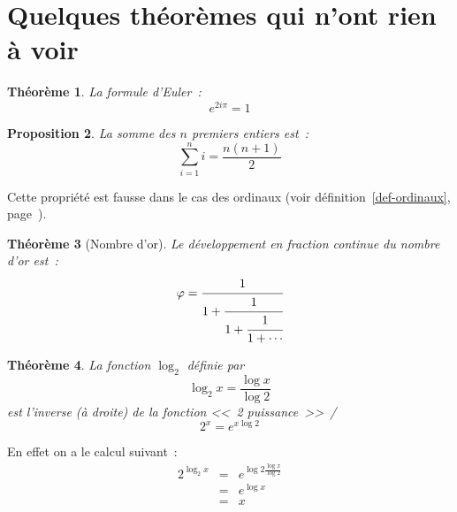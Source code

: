\documentclass{article}
\newtheorem{theo}{Théorème}[section]    %
\newtheorem{prop}[theo]{Proposition}    %
\newcommand{\expo}[2]{#1^{#2}}
\begin{document}
\section{Quelques théorèmes qui n'ont rien à voir}

\begin{theo}
  La formule d'Euler~:
  \begin{equation}
    \expo e{2i\pi}=1 %
  \end{equation}
\end{theo}

\begin{prop}
  La somme des $n$ premiers entiers est~:
  \begin{displaymath}
    \sum_{i=1}^ni = \frac{n(n+1)}2
  \end{displaymath}
\end{prop}
Cette propriété est fausse dans le cas des ordinaux (voir
définition~\ref{def-ordinaux}, page~\pageref{def-ordinaux}).

\begin{theo}[Nombre d'or]
  Le développement en fraction continue du nombre d'or est~:
  \begin{equation*} %
    \varphi = \cfrac 1{1+\cfrac 1{1 + \cfrac 1{1 + \dotsb}}}
  \end{equation*}
\end{theo}

\begin{theo}\label{theo-log2}
  La fonction $\log_2$ définie par
  \begin{displaymath}
    \log_2 x = \frac{\log x}{\log 2}
  \end{displaymath}
  est l'inverse (à droite) de la fonction <<~2 puissance~>>~/
  \begin{displaymath}
    2^x = e^{x\log 2}
  \end{displaymath}
\end{theo}

En effet on a le calcul suivant~:
\begin{eqnarray*}
 2^{\log_2 x} &=& e^{\log 2\frac{\log x}{\log 2}}\\
              &=& e^{\log x}\\
              &=& x
\end{eqnarray*}
\end{document}
